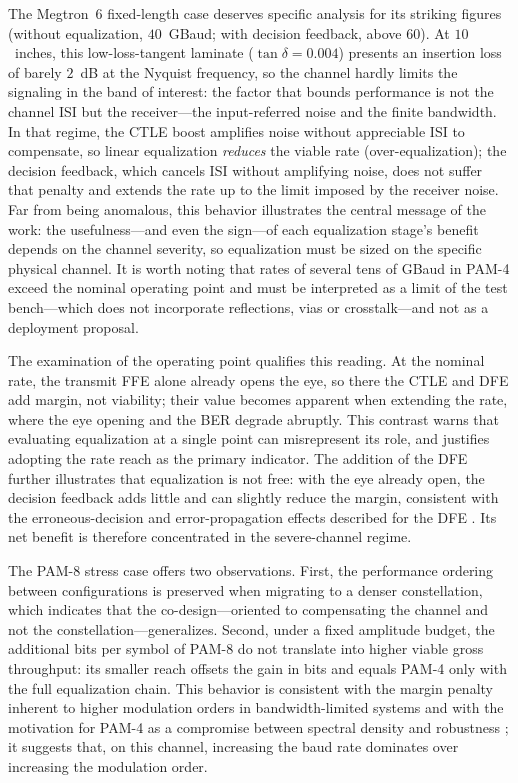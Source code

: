 \documentclass[preprint,review,12pt]{elsarticle}
\begin{document}
The Megtron~6 fixed-length case deserves specific analysis for its
striking figures (without equalization, $40$~GBaud; with decision
feedback, above $60$). At $10$~inches, this low-loss-tangent laminate
($\tan\delta=0.004$) presents an insertion loss of barely $2$~dB at the
Nyquist frequency, so the channel hardly limits the signaling in the band
of interest: the factor that bounds performance is not the channel ISI but
the receiver---the input-referred noise and the finite bandwidth. In that
regime, the CTLE boost amplifies noise without appreciable ISI to
compensate, so linear equalization \emph{reduces} the viable rate
(over-equalization); the decision feedback, which cancels ISI without
amplifying noise, does not suffer that penalty and extends the rate up to
the limit imposed by the receiver noise. Far from being anomalous, this
behavior illustrates the central message of the work: the usefulness---and
even the sign---of each equalization stage's benefit depends on the
channel severity, so equalization must be sized on the specific physical
channel. It is worth noting that rates of several tens of GBaud in PAM-4
exceed the nominal operating point and must be interpreted as a limit of
the test bench---which does not incorporate reflections, vias or
crosstalk---and not as a deployment proposal.

The examination of the operating point qualifies this reading. At the
nominal rate, the transmit FFE alone already opens the eye, so there the
CTLE and DFE add margin, not viability; their value becomes apparent when
extending the rate, where the eye opening and the BER degrade abruptly.
This contrast warns that evaluating equalization at a single point can
misrepresent its role, and justifies adopting the rate reach as the
primary indicator. The addition of the DFE further illustrates that
equalization is not free: with the eye already open, the decision feedback
adds little and can slightly reduce the margin, consistent with the
erroneous-decision and error-propagation effects described for the DFE
\citep{10584882,9505189}. Its net benefit is therefore concentrated in the
severe-channel regime.

The PAM-8 stress case offers two observations. First, the performance
ordering between configurations is preserved when migrating to a denser
constellation, which indicates that the co-design---oriented to
compensating the channel and not the constellation---generalizes. Second,
under a fixed amplitude budget, the additional bits per symbol of PAM-8 do
not translate into higher viable gross throughput: its smaller reach
offsets the gain in bits and equals PAM-4 only with the full equalization
chain. This behavior is consistent with the margin penalty inherent to
higher modulation orders in bandwidth-limited systems \citep{8963973} and
with the motivation for PAM-4 as a compromise between spectral density and
robustness \citep{7964959}; it suggests that, on this channel, increasing
the baud rate dominates over increasing the modulation order.
\end{document}
